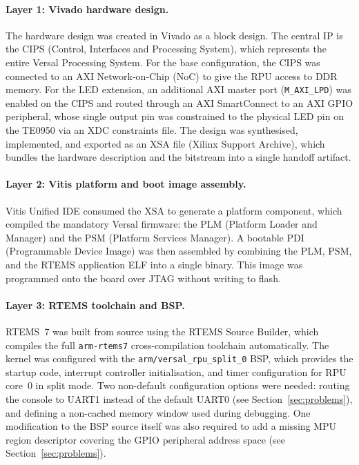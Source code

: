 \documentclass[10pt,a4]{article}
\begin{document}
\paragraph{Layer 1: Vivado hardware design.}
The hardware design was created in Vivado as a block design.
The central IP is the CIPS (Control, Interfaces and Processing System), which
represents the entire Versal Processing System.
For the base configuration, the CIPS was connected to an AXI Network-on-Chip
(NoC) to give the RPU access to DDR memory.
For the LED extension, an additional AXI master port (\texttt{M\_AXI\_LPD})
was enabled on the CIPS and routed through an AXI SmartConnect to an AXI GPIO
peripheral, whose single output pin was constrained to the physical LED pin on
the TE0950 via an XDC constraints file.
The design was synthesised, implemented, and exported as an XSA file (Xilinx
Support Archive), which bundles the hardware description and the bitstream into
a single handoff artifact.

\paragraph{Layer 2: Vitis platform and boot image assembly.}
Vitis Unified IDE consumed the XSA to generate a platform component, which
compiled the mandatory Versal firmware: the PLM (Platform Loader and Manager)
and the PSM (Platform Services Manager).
A bootable PDI (Programmable Device Image) was then assembled by combining the
PLM, PSM, and the RTEMS application ELF into a single binary.
This image was programmed onto the board over JTAG without writing to flash.

\paragraph{Layer 3: RTEMS toolchain and BSP.}
RTEMS~7 was built from source using the RTEMS Source Builder, which compiles
the full \texttt{arm-rtems7} cross-compilation toolchain automatically.
The kernel was configured with the \newline \texttt{arm/versal\_rpu\_split\_0} BSP,
which provides the startup code, interrupt controller initialisation, and timer
configuration for RPU core~0 in split mode.
Two non-default configuration options were needed: routing the console to UART1
instead of the default UART0 (see Section~\ref{sec:problems}), and defining a
non-cached memory window used during debugging.
One modification to the BSP source itself was also required to add a missing
MPU region descriptor covering the GPIO peripheral address space (see
Section~\ref{sec:problems}).
\end{document}

